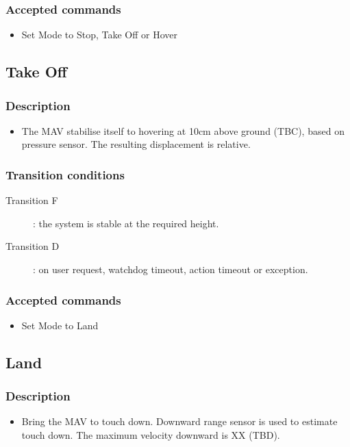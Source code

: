 \documentclass{article}
\begin{document}
\subsubsection{Accepted commands}
\begin{itemize}
\item Set Mode to Stop, Take Off or Hover
\end{itemize}

\subsection{Take Off}
\subsubsection{Description}
\begin{itemize}
\item The MAV stabilise itself to hovering at 10cm above ground (TBC), based on
pressure sensor. The resulting displacement is relative.
\end{itemize}
\subsubsection{Transition conditions}
\begin{description}
\item[Transition F]: the system is stable at the required height.
\item[Transition D]: on user request, watchdog timeout, action timeout or exception.
\end{description}
\subsubsection{Accepted commands}
\begin{itemize}
\item Set Mode to Land
\end{itemize}

\subsection{Land}
\subsubsection{Description}
\begin{itemize}
\item Bring the MAV to touch down. Downward range sensor is used to estimate
touch down. The maximum velocity downward is XX (TBD). 
\end{itemize}
\end{document}
